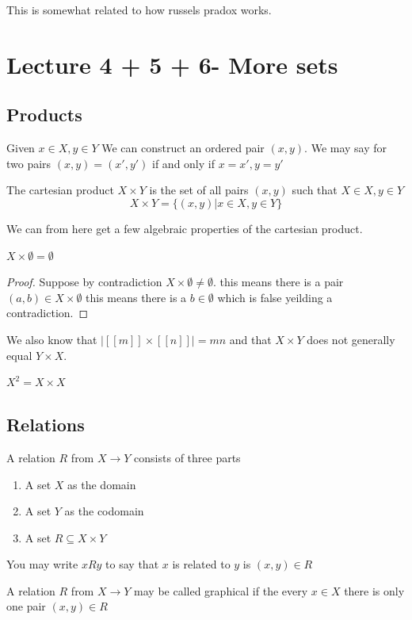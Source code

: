 \documentclass{article}
\begin{document}
This is somewhat related to how russels pradox works.
\section{Lecture 4 + 5 + 6- More sets}
\subsection{Products}
\begin{definition}
    Given $x \in X,y \in Y$ We can construct an ordered pair $(x,y)$. We may say for two pairs $(x,y) = (x',y')$ if and only if $x=x',y=y'$
\end{definition}
\begin{definition}
    The cartesian product $X \times Y$ is the set of all pairs $(x,y)$ such that $X \in X,y \in Y$
    \[X \times Y = \{(x,y) | x \in X,y \in Y\}\]
\end{definition}
We can from here get a few algebraic properties of the cartesian product. 
\begin{proposition}
    $X \times \emptyset = \emptyset$
\end{proposition}
\begin{proof}
    Suppose by contradiction $X \times \emptyset \ne \emptyset$. this means there is a pair $(a,b) \in X \times \emptyset$ this means there is a $b \in \emptyset$ which is false yeilding a contradiction.
\end{proof}
We also know that $|[[m]] \times [[n]]| = mn$ and that $X \times Y$ does not generally equal $Y \times X$.
\begin{definition}
    $X^2 = X \times X$
\end{definition}
\subsection{Relations}
\begin{definition}
    A relation $R$ from $X \to Y$ consists of three parts 
    \begin{enumerate}
        \item A set $X$ as the domain
        \item A set $Y$ as the codomain
        \item A set $R \subseteq X \times Y$
    \end{enumerate}
\end{definition}
You may write $xRy$ to say that $x$ is related to $y$ is $(x,y) \in R$
\begin{definition}
    A relation $R$ from $X \to Y$ may be called graphical if the every $x \in X$ there is only one pair $(x,y) \in R$
\end{definition}
\end{document}
